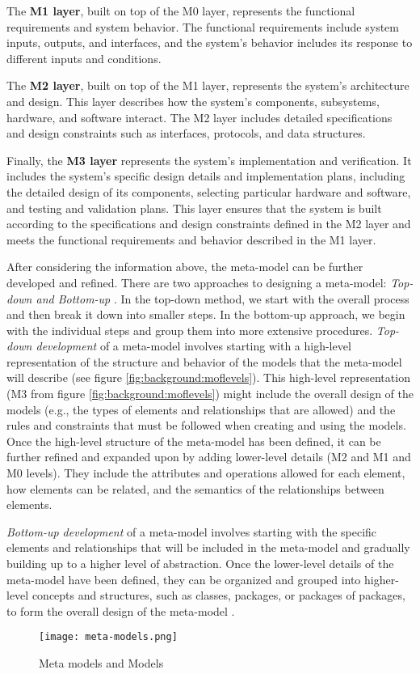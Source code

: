 The \textbf{M1 layer}, built on top of the M0 layer, represents the functional requirements and system behavior.
The functional requirements include system inputs, outputs, and interfaces, and the system's behavior includes its response to different inputs and conditions.

The \textbf{M2 layer}, built on top of the M1 layer, represents the system's architecture and design. 
This layer describes how the system's components, subsystems, hardware, and software interact.
The M2 layer includes detailed specifications and design constraints such as interfaces, protocols, and data structures.

Finally, the \textbf{M3 layer} represents the system's implementation and verification. 
It includes the system's specific design details and implementation plans, including the detailed design of its components, selecting particular hardware and software, and testing and validation plans. 
This layer ensures that the system is built according to the specifications and design constraints defined in the M2 layer and meets the functional requirements and behavior described in the M1 layer.

After considering the information above, the meta-model can be further developed and refined. 
There are two approaches to designing a meta-model: \textit{Top-down and Bottom-up} \cite{misc:mbse:mof}. 
In the top-down method, we start with the overall process and then break it down into smaller steps. 
In the bottom-up approach, we begin with the individual steps and group them into more extensive procedures.
\textit{Top-down development} of a meta-model involves starting with a high-level representation of the structure and behavior of the models that the meta-model will describe (see figure \ref{fig:background:moflevels}). 
This high-level representation (M3 from figure \ref{fig:background:moflevels}) might include the overall design of the models (e.g., the types of elements and relationships that are allowed) and the rules and constraints that must be followed when creating and using the models.
Once the high-level structure of the meta-model has been defined, it can be further refined and expanded upon by adding lower-level details (M2 and M1 and M0 levels). 
They include the attributes and operations allowed for each element, how elements can be related, and the semantics of the relationships between elements.

\textit{Bottom-up development} of a meta-model involves starting with the specific elements and relationships that will be included in the meta-model and gradually building up to a higher level of abstraction. 
Once the lower-level details of the meta-model have been defined, they can be organized and grouped into higher-level concepts and structures, such as classes, packages, or packages of packages, to form the overall design of the meta-model \cite{misc:mbse:mof}.
\begin{figure}[htbp!]
  \centering    
  \texttt{[image: meta-models.png]}
  \caption[Meta models]{Meta models and Models}
  \label{fig:background:m1m2}
\end{figure}


